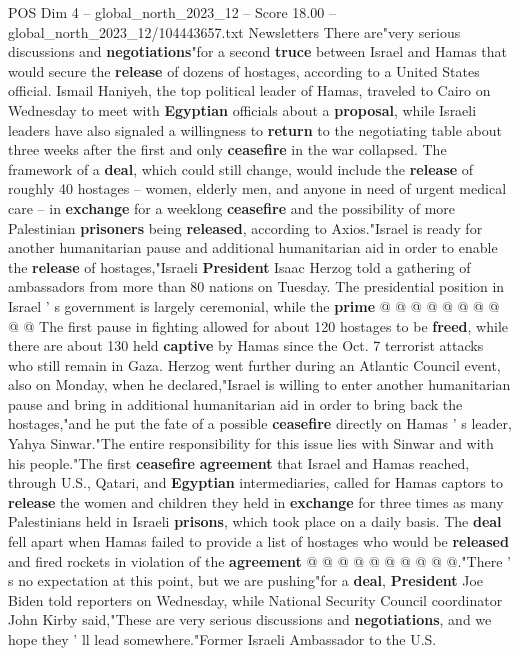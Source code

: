 \begin{textsample}{POS Dim 4 – global\_north\_2023\_12 – Score 18.00 – global\_north\_2023\_12/104443657.txt}  \label{ex:f4_pos_315}
Newsletters There are"very serious discussions and \textbf{negotiations}"for a second \textbf{truce} between Israel and Hamas that would secure the \textbf{release} of dozens of hostages, according to a United States official.
Ismail Haniyeh, the top political leader of Hamas, traveled to Cairo on Wednesday to meet with \textbf{Egyptian} officials about a \textbf{proposal}, while Israeli leaders have also signaled a willingness to \textbf{return} to the negotiating table about three weeks after the first and only \textbf{ceasefire} in the war collapsed.
The framework of a \textbf{deal}, which could still change, would include the \textbf{release} of roughly 40 hostages -- women, elderly men, and anyone in need of urgent medical care -- in \textbf{exchange} for a weeklong \textbf{ceasefire} and the possibility of more Palestinian \textbf{prisoners} being \textbf{released}, according to Axios."Israel is ready for another humanitarian pause and additional humanitarian aid in order to enable the \textbf{release} of hostages,"Israeli \textbf{President} Isaac Herzog told a gathering of ambassadors from more than 80 nations on Tuesday.
The presidential position in Israel ' s government is largely ceremonial, while the \textbf{prime} @ @ @ @ @ @ @ @ @ @ The first pause in fighting allowed for about 120 hostages to be \textbf{freed}, while there are about 130 held \textbf{captive} by Hamas since the Oct. 7 terrorist attacks who still remain in Gaza.
Herzog went further during an Atlantic Council event, also on Monday, when he declared,"Israel is willing to enter another humanitarian pause and bring in additional humanitarian aid in order to bring back the hostages,"and he put the fate of a possible \textbf{ceasefire} directly on Hamas ' s leader, Yahya Sinwar."The entire responsibility for this issue lies with Sinwar and with his people."The first \textbf{ceasefire} \textbf{agreement} that Israel and Hamas reached, through U.S., Qatari, and \textbf{Egyptian} intermediaries, called for Hamas captors to \textbf{release} the women and children they held in \textbf{exchange} for three times as many Palestinians held in Israeli \textbf{prisons}, which took place on a daily basis.
The \textbf{deal} fell apart when Hamas failed to provide a list of hostages who would be \textbf{released} and fired rockets in violation of the \textbf{agreement} @ @ @ @ @ @ @ @ @ @."There ' s no expectation at this point, but we are pushing"for a \textbf{deal}, \textbf{President} Joe Biden told reporters on Wednesday, while National Security Council coordinator John Kirby said,"These are very serious discussions and \textbf{negotiations}, and we hope they ' ll lead somewhere."Former Israeli Ambassador to the U.S.

\end{textsample}
